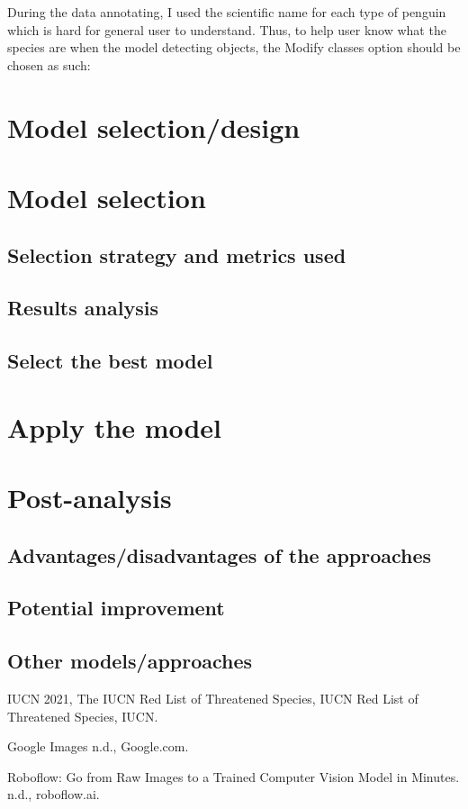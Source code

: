 \documentclass[runningheads]{llncs}
\begin{document}
During the data annotating, I used the scientific name for each type of penguin which is hard for general user to understand. Thus, to help user know what the species are when the model detecting objects, the Modify classes option should be chosen as such:


\section{Model selection/design}


\section{Model selection}
\subsection{Selection strategy and metrics used}

\subsection{Results analysis}

\subsection{Select the best model}


\section{Apply the model}


\section{Post-analysis}
\subsection{Advantages/disadvantages of the approaches}

\subsection{Potential improvement}

\subsection{Other models/approaches}


\begin{thebibliography}{8}
IUCN 2021, The IUCN Red List of Threatened Species, IUCN Red List of Threatened Species, IUCN.

Google Images n.d., Google.com.

Roboflow: Go from Raw Images to a Trained Computer Vision Model in Minutes. n.d., roboflow.ai.

\end{thebibliography}
\end{document}
